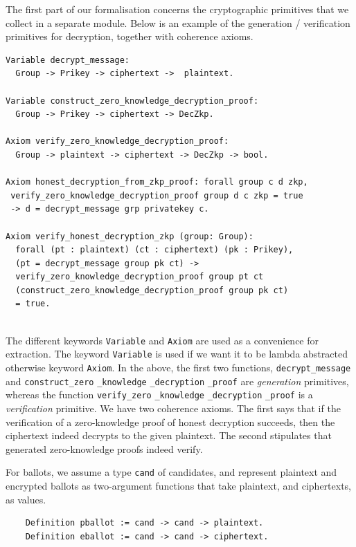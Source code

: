 The first part of our formalisation concerns the cryptographic
primitives that we collect in a separate module. Below is an example
of the generation / verification primitives for decryption, together
with coherence axioms.

\begin{verbatim}
Variable decrypt_message: 
  Group -> Prikey -> ciphertext ->  plaintext.

Variable construct_zero_knowledge_decryption_proof:
  Group -> Prikey -> ciphertext -> DecZkp.

Axiom verify_zero_knowledge_decryption_proof:
  Group -> plaintext -> ciphertext -> DecZkp -> bool.

Axiom honest_decryption_from_zkp_proof: forall group c d zkp, 
 verify_zero_knowledge_decryption_proof group d c zkp = true 
 -> d = decrypt_message grp privatekey c.
 
Axiom verify_honest_decryption_zkp (group: Group):
  forall (pt : plaintext) (ct : ciphertext) (pk : Prikey),
  (pt = decrypt_message group pk ct) ->
  verify_zero_knowledge_decryption_proof group pt ct 
  (construct_zero_knowledge_decryption_proof group pk ct) 
  = true.
  

\end{verbatim}
  
\noindent
The different keywords \texttt{Variable} and \texttt{Axiom}
are used as a convenience for 
extraction. The keyword  \texttt{Variable} is used if we want it
to be lambda abstracted otherwise keyword \texttt{Axiom}. In
the above, the first two functions, \texttt{decrypt\_message} and
\texttt{construct\_zero} \texttt{\_knowledge} \texttt{\_decryption} \texttt{\_proof} are
\emph{generation} primitives, whereas the function 
\texttt{verify\_zero} \texttt{\_knowledge} \linebreak
\texttt{\_decryption} \texttt{\_proof} is a
\emph{verification} primitive. We have two coherence axioms. The
first says that if the verification of a zero-knowledge proof of
honest decryption succeeds, then the ciphertext indeed decrypts to
the given plaintext. The second stipulates that generated zero-knowledge proofs indeed verify. 

For ballots, we assume a type \texttt{cand} of candidates, and
represent plaintext and encrypted ballots as two-argument functions
that take plaintext, and ciphertexts, as values. 
\begin{verbatim}
    Definition pballot := cand -> cand -> plaintext.
    Definition eballot := cand -> cand -> ciphertext.
\end{verbatim}



